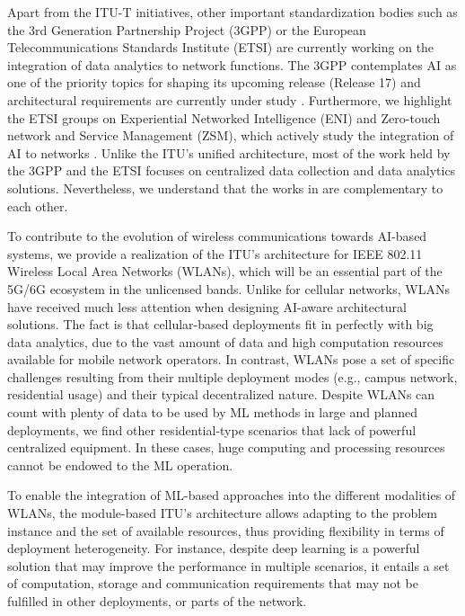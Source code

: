 \documentclass{article}
\begin{document}
Apart from the ITU-T initiatives, other important standardization bodies such as the 3rd Generation Partnership Project (3GPP) or the European Telecommunications Standards Institute (ETSI) are currently working on the integration of data analytics to network functions. The 3GPP contemplates AI as one of the priority topics for shaping its upcoming release (Release 17) and architectural requirements are currently under study \cite{3gpp2019study}. Furthermore, we highlight the ETSI groups on Experiential Networked Intelligence (ENI) and Zero-touch network and Service Management (ZSM), which actively study the integration of AI to networks \cite{etsi2019architecture}. Unlike the ITU's unified architecture, most of the work held by the 3GPP and the ETSI focuses on centralized data collection and data analytics solutions. Nevertheless, we understand that the works in \cite{itu2019architecture, 3gpp2019study, etsi2019architecture} are complementary to each other.

To contribute to the evolution of wireless communications towards AI-based systems, we provide a realization of the ITU's architecture for IEEE 802.11 Wireless Local Area Networks (WLANs), which will be an essential part of the 5G/6G ecosystem in the unlicensed bands. Unlike for cellular networks, WLANs have received much less attention when designing AI-aware architectural solutions. The fact is that cellular-based deployments fit in perfectly with big data analytics, due to the vast amount of data and high computation resources available for mobile network operators. In contrast, WLANs pose a set of specific challenges resulting from their multiple deployment modes (e.g., campus network, residential usage) and their typical decentralized nature. Despite WLANs can count with plenty of data to be used by ML methods in large and planned deployments, we find other residential-type scenarios that lack of powerful centralized equipment. In these cases, huge computing and processing resources cannot be endowed to the ML operation. 

To enable the integration of ML-based approaches into the different modalities of WLANs, the module-based ITU's architecture allows adapting to the problem instance and the set of available resources, thus providing flexibility in terms of deployment heterogeneity. For instance, despite deep learning is a powerful solution that may improve the performance in multiple scenarios, it entails a set of computation, storage and communication requirements that may not be fulfilled in other deployments, or parts of the network.
\end{document}

